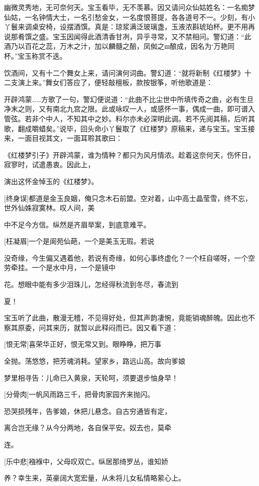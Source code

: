 幽微灵秀地，无可奈何天。宝玉看毕，无不羡慕。因又请问众仙姑姓名：一名痴梦仙姑，一名钟情大士，一名引愁金女，一名度恨菩提，各各道号不一。少刻，有小丫鬟来调桌安椅，设摆酒馔。真是：琼浆满泛玻璃盏，玉液浓斟琥珀杯。更不用再说那肴馔之盛。宝玉因闻得此酒清香甘冽，异乎寻常，又不禁相问。警幻道：“此酒乃以百花之蕊，万木之汁，加以麟髓之醅，凤侞之ш酿成，因名为`万艳同杯。”宝玉称赏不迭。

饮酒间，又有十二个舞女上来，请问演何词曲。警幻道：“就将新制《红楼梦》十二支演上来。”舞女们答应了，便轻敲檀板，款按银筝，听他歌道是：

开辟鸿蒙……方歌了一句，警幻便说道：“此曲不比尘世中所填传奇之曲，必有生旦净末之则，又有南北九宫之限。此或咏叹一人，或感怀一事，偶成一曲，即可谱入管弦。若非个中人，不知其中之妙。料尔亦未必深明此调。若不先阅其稿，后听其歌，翻成嚼蜡矣。”说毕，回头命小丫鬟取了《红楼梦》原稿来，递与宝玉。宝玉接来，一面目视其文，一面耳聆其歌曰：

《红楼梦引子》开辟鸿蒙，谁为情种？都只为风月情浓。趁着这奈何天，伤怀日，寂寥时，试遣愚衷。因此上，

演出这怀金悼玉的《红楼梦》。

[终身误]都道是金玉良姻，俺只念木石前盟。空对着，山中高士晶莹雪，终不忘，世外仙姝寂寞林。叹人间，美

中不足今方信。纵然是齐眉举案，到底意难平。

[枉凝眉]一个是阆苑仙葩，一个是美玉无瑕。若说

没奇缘，今生偏又遇着他，若说有奇缘，如何心事终虚化？一个枉自嗟呀，一个空劳牵挂。一个是水中月，一个是镜中

花。想眼中能有多少泪珠儿，怎经得秋流到冬尽，春流到

夏！

宝玉听了此曲，散漫无稽，不见得好处，但其声韵凄惋，竟能销魂醉魄。因此也不察其原委，问其来历，就暂以此释闷而已。因又看下道：

[恨无常]喜荣华正好，恨无常又到。眼睁睁，把万事

全抛。荡悠悠，把芳魂消耗。望家乡，路远山高。故向爹娘

梦里相寻告：儿命已入黄泉，天轮呵，须要退步怞身早！

[分骨肉]一帆风雨路三千，把骨肉家园齐来抛闪。

恐哭损残年，告爹娘，休把儿悬念。自古穷通皆有定，

离合岂无缘？从今分两地，各自保平安。奴去也，莫牵

连。

[乐中悲]襁褓中，父母叹双亡。纵居那绮罗丛，谁知娇

养？幸生来，英豪阔大宽宏量，从未将儿女私情略萦心上。

